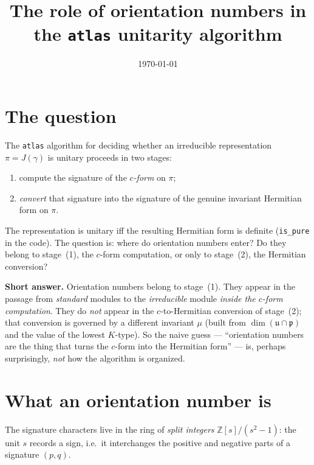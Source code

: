 \documentclass[11pt]{article}
\title{The role of orientation numbers in the \texttt{atlas} unitarity algorithm}
\author{}
\date{\today}
\newcommand{\Z}{\mathbb{Z}}
\newcommand{\p}{\mathfrak{p}}
\newcommand{\uu}{\mathfrak{u}}
\DeclareMathOperator{\dimm}{dim}
\begin{document}
\maketitle

\section{The question}

The \texttt{atlas} algorithm for deciding whether an irreducible representation
$\pi=J(\gamma)$ is unitary proceeds in two stages:
\begin{enumerate}
  \item[(1)] compute the signature of the \emph{$c$-form} on $\pi$;
  \item[(2)] \emph{convert} that signature into the signature of the genuine
        invariant Hermitian form on $\pi$.
\end{enumerate}
The representation is unitary iff the resulting Hermitian form is definite
(\texttt{is\_pure} in the code).  The question is: where do orientation numbers
enter?  Do they belong to stage~(1), the $c$-form computation, or only to
stage~(2), the Hermitian conversion?

\medskip
\noindent\textbf{Short answer.}  Orientation numbers belong to stage~(1).  They
appear in the passage from \emph{standard} modules to the \emph{irreducible}
module \emph{inside the $c$-form computation}.  They do \emph{not} appear in the
$c$-to-Hermitian conversion of stage~(2); that conversion is governed by a
different invariant $\mu$ (built from $\dimm(\uu\cap\p)$ and the value of the
lowest $K$-type).  So the naive guess --- ``orientation numbers are the thing
that turns the $c$-form into the Hermitian form'' --- is, perhaps surprisingly,
\emph{not} how the algorithm is organized.

\section{What an orientation number is}

The signature characters live in the ring of \emph{split integers}
$\Z[s]/(s^2-1)$: the unit $s$ records a sign, i.e.\ it interchanges the positive
and negative parts of a signature $(p,q)$.
\end{document}
